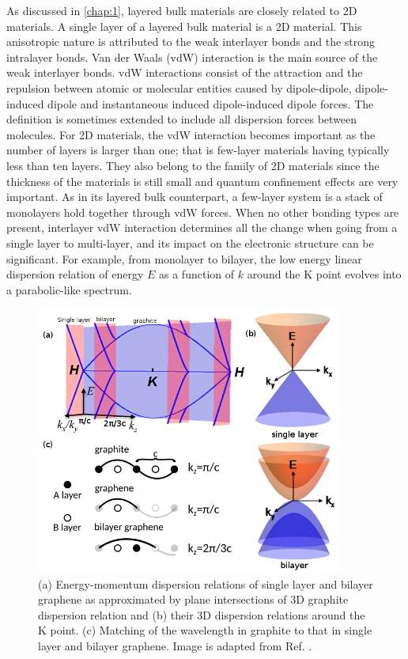 As discussed in \autoref{chap:1}, layered bulk materials are closely related to 2D materials. A single layer of a layered bulk material is a 2D material. This anisotropic nature is attributed to the weak interlayer bonds and the strong intralayer bonds. Van der Waals (vdW) interaction \cite{vdws} is the main source of the weak interlayer bonds. vdW interactions consist of the attraction and the repulsion between atomic or molecular entities caused by dipole-dipole, dipole-induced dipole and instantaneous induced dipole-induced dipole forces. The definition is sometimes extended to include all dispersion forces between molecules.  For 2D materials, the vdW interaction becomes important as the number of layers is larger than one; that is few-layer materials having typically less than ten layers. They also belong to the family of 2D materials since the thickness of the materials is still small and quantum confinement effects are very important. As in its layered bulk counterpart, a few-layer system is a stack of monolayers hold together through vdW forces. When no other bonding types are present, interlayer vdW interaction determines all the change when going from a single layer to multi-layer, and its impact on the electronic structure can be significant. For example, from monolayer to bilayer, the low energy linear dispersion relation of energy $E$ as a function of $k$ around the $\mathrm{K}$ point evolves into a parabolic-like spectrum\cite{Partoens2006,Mak2010a}. 

\begin{figure}[ht] 
\centering  
\includegraphics[width=0.9\textwidth]{gra_band.png}
\caption[Energy-momentum dispersion of graphene from graphite]{(a) Energy-momentum dispersion relations of single layer and bilayer graphene as approximated by plane intersections of 3D graphite dispersion relation and (b) their 3D dispersion relations around the $\mathrm{K}$ point. (c) Matching of the wavelength in graphite to that in single layer and bilayer graphene. Image is adapted from Ref. \cite{Mak2010a}. }  
\label{fig:gra_bands}
\end{figure} 

